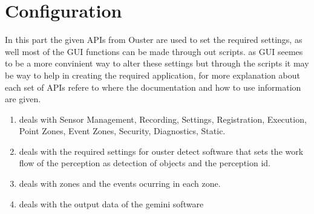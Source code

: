 \documentclass[letterpaper,10pt,english]{sphinxmanual}
\begin{document}
\section{Configuration}
\label{\detokenize{projectdoc:configuration}}
\sphinxAtStartPar
In this part the given APIs from Ouster are used to set the required settings, as well most of the GUI functions can be made through out scripts.
as GUI seemes to be a more convinient way to alter these settings but through the scripts it may be way to help in creating the required application,
for more explanation about each set of APIs refere to {\hyperref[\detokenize{codedoc:apisection}]{}} where the documentation and how to use information are given.
\begin{enumerate}
%
\item {} \begin{description}
\sphinxAtStartPar
deals with Sensor Management, Recording, Settings, Registration, Execution, Point Zones, Event Zones, Security, Diagnostics, Static.

\end{description}

\item {} \begin{description}
\sphinxAtStartPar
deals with the required settings for ouster detect software that sets the work flow of the perception as detection of objects and the perception id.

\end{description}

\item {} \begin{description}
\sphinxAtStartPar
deals with zones and the events ocurring in each zone.

\end{description}

\item {} \begin{description}
\sphinxAtStartPar
deals with the output data of the gemini software


\end{description}
\end{enumerate}
\end{document}
